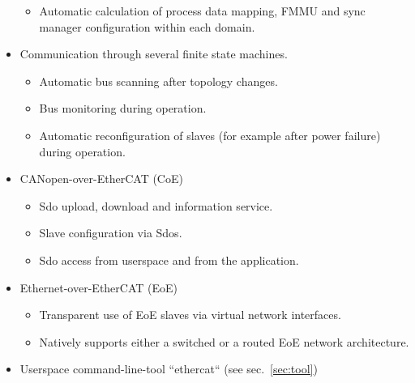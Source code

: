 \documentclass[a4paper,12pt,BCOR6mm,bibtotoc,idxtotoc]{scrbook}
\begin{document}
\begin{itemize}
\begin{itemize}
  \item Automatic calculation of process data mapping, FMMU and sync manager
  configuration within each domain.

  \end{itemize}

\item Communication through several finite state machines.

  \begin{itemize}

  \item Automatic bus scanning after topology changes.

  \item Bus monitoring during operation.

  \item Automatic reconfiguration of slaves (for example after power failure)
  during operation.

  \end{itemize}

\item CANopen-over-EtherCAT (CoE)

  \begin{itemize}

  \item Sdo upload, download and information service.

  \item Slave configuration via Sdos.

  \item Sdo access from userspace and from the application.

  \end{itemize}

\item Ethernet-over-EtherCAT (EoE)

  \begin{itemize}

  \item Transparent use of EoE slaves via virtual network interfaces.

  \item Natively supports either a switched or a routed EoE network
  architecture.

  \end{itemize}

\item Userspace command-line-tool ``ethercat`` (see sec.~\ref{sec:tool})

  \begin{itemize}


\end{itemize}
\end{itemize}
\end{document}
